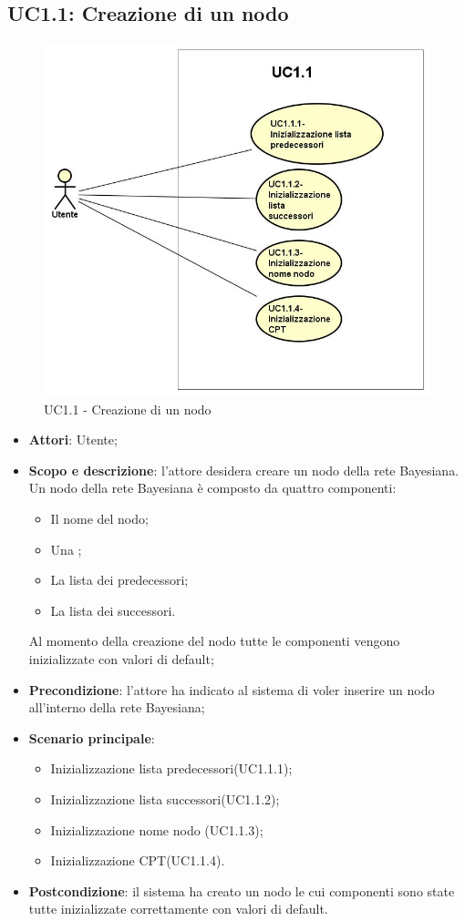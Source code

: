 \subsection{UC1.1: Creazione di un nodo}
\hypertarget{UC1.1}{}  
\begin{figure} [H]
	\centering
	\includegraphics[scale=0.45]{Img/UC1-1} 
	\caption{UC1.1 - Creazione di un nodo} \label{} 
\end{figure} 
\begin{itemize} 
	\item{\textbf{Attori}: Utente;} 
	\item{\textbf{Scopo e descrizione}: l'attore desidera creare un nodo della rete Bayesiana. Un nodo della rete Bayesiana è composto da quattro componenti: 
		\begin{itemize} 
			\item{Il nome del nodo;} 
			\item{Una ;} 
			\item{La lista dei predecessori;} 
			\item{La lista dei successori.} 
		\end{itemize} 
		Al momento della creazione del nodo tutte le componenti vengono inizializzate con valori di default;} 
	\item{\textbf{Precondizione}: l'attore ha indicato al sistema di voler inserire un nodo all'interno della rete Bayesiana;} 
	\item{\textbf{Scenario principale}: } 
	\begin{itemize} 
		\item{Inizializzazione lista predecessori(UC1.1.1);} 
		\item{Inizializzazione lista successori(UC1.1.2);} 
		\item{Inizializzazione nome nodo (UC1.1.3);} 
		\item{Inizializzazione CPT(UC1.1.4).} 
	\end{itemize} 
	\item{\textbf{Postcondizione}: il sistema ha creato un nodo le cui componenti sono state tutte inizializzate correttamente con valori di default.} 
\end{itemize} 

